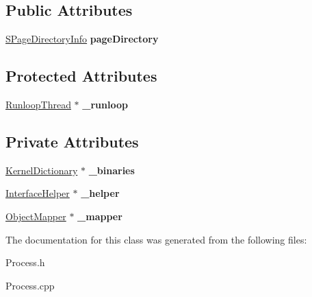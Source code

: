 \subsection*{Public Attributes}
\begin{DoxyCompactItemize}
\item 
\mbox{\label{class_process_a44815d57592e2fa9392d9bec9855d86e}} 
\hyperlink{class_s_page_directory_info}{S\+Page\+Directory\+Info} {\bfseries page\+Directory}
\end{DoxyCompactItemize}
\subsection*{Protected Attributes}
\begin{DoxyCompactItemize}
\item 
\mbox{\label{class_process_adbaa52e1d1cdb01a2719438067f766a4}} 
\hyperlink{class_runloop_thread}{Runloop\+Thread} $\ast$ {\bfseries \+\_\+runloop}
\end{DoxyCompactItemize}
\subsection*{Private Attributes}
\begin{DoxyCompactItemize}
\item 
\mbox{\label{class_process_a94d7d97673d347d53c6fc6f402f6bb1f}} 
\hyperlink{class_kernel_dictionary}{Kernel\+Dictionary} $\ast$ {\bfseries \+\_\+binaries}
\item 
\mbox{\label{class_process_a049445237da4e6f60b413653da0de65f}} 
\hyperlink{class_interface_helper}{Interface\+Helper} $\ast$ {\bfseries \+\_\+helper}
\item 
\mbox{\label{class_process_ab471040cd2bb848d058459f81c6b302c}} 
\hyperlink{class_object_mapper}{Object\+Mapper} $\ast$ {\bfseries \+\_\+mapper}
\end{DoxyCompactItemize}


The documentation for this class was generated from the following files\+:\begin{DoxyCompactItemize}
\item 
Process.\+h\item 
Process.\+cpp\end{DoxyCompactItemize}
